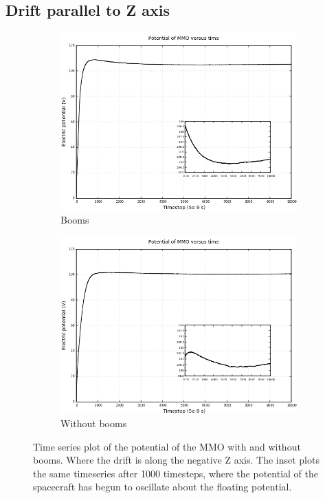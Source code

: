 \subsection*{Drift parallel to Z axis}
\begin{center}
    \begin{figure}[H]
      \begin{subfigure}[b]{0.75\textwidth}
      \includegraphics[width=\columnwidth]{figures/MMO/minZ/Booms/MMO_Booms_driftMinZ_timeseries.png}
      \caption{Booms}
      \label{fig:MMO_Booms_driftMinZ_timeseries}
    \end{subfigure}
    \par\bigskip
    \begin{subfigure}[b]{0.75\textwidth}
      \includegraphics[width=\columnwidth]{figures/MMO/minZ/noBooms/MMO_noBooms_driftMinZ_timeseries.png}
      \caption{Without booms}
      \label{fig:MMO_noBooms_driftMinZ_timeseries}
    \end{subfigure}
  \label{fig:DriftMinZTimeseries}
  \caption{Time series plot of the potential of the MMO with and without booms. Where the drift is along the negative Z axis. The inset plots the same timeseries after 1000 timesteps, where the potential of the spacecraft has begun to oscillate about the floating potential.}
  \end{figure}
\end{center}


